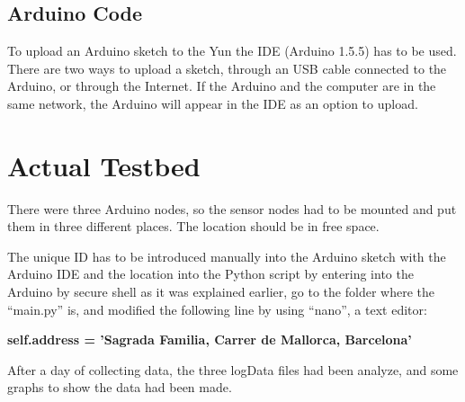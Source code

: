 \documentclass[12pt, a4paper,twoside]{tesi_upf}
\begin{document}
  \subsection{Arduino Code}
    To upload an Arduino sketch to the Yun the IDE (Arduino 1.5.5) has to be used. There are two ways to upload a sketch, through an USB cable connected to the Arduino, or through the Internet. If the Arduino and the computer are in the same network, the Arduino will appear in the IDE as an option to upload.
  
  \section{Actual Testbed}
    There were three Arduino nodes, so the sensor nodes had to be mounted and put them in three different places. The location should be in free space.
    
    The unique ID has to be introduced manually into the Arduino sketch with the Arduino IDE and the location into the Python script by entering into the Arduino by secure shell as it was explained earlier, go to the folder where the ``main.py'' is, and modified the following line by using ``nano'', a text editor:
    
    {\begin{centering} \textbf{self.address = 'Sagrada Familia, Carrer de Mallorca, Barcelona'}\par \end{centering}}
    
    After a day of collecting data, the three logData files had been analyze, and some graphs to show the data had been made.
    
\end{document}
